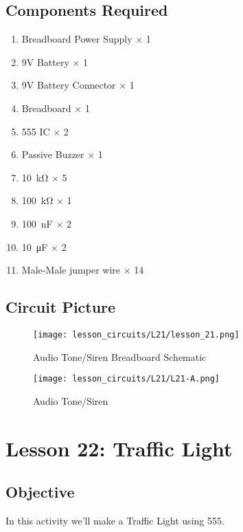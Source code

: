 \subsection{Components Required}
\begin{enumerate}
    \item Breadboard Power Supply $\times$ 1
    \item 9V Battery $\times$ 1
    \item 9V Battery Connector $\times$ 1
    \item Breadboard $\times$ 1
    \item 555 IC $\times$ 2
    \item Passive Buzzer $\times$ 1
    \item \SI{10}{\kilo\ohm} $\times$ 5
    \item \SI{100}{\kilo\ohm} $\times$ 1
    \item \SI{100}{\nano\farad} $\times$ 2
    \item \SI{10}{\micro\farad} $\times$ 2
    \item Male-Male jumper wire $\times$ 14
\end{enumerate}
\subsection{Circuit Picture}
\begin{figure}[!hp]
    \centering
    \texttt{[image: lesson\_circuits/L21/lesson\_21.png]}
    \caption{Audio Tone/Siren Breadboard Schematic}
    \label{fig:555_audsi_sch}
\end{figure}
\begin{figure}[!hp]
    \centering
    \texttt{[image: lesson\_circuits/L21/L21-A.png]}
    \caption{Audio Tone/Siren}
    \label{fig:555_audsi_obb}
\end{figure}
\section{Lesson 22: Traffic Light}
\subsection{Objective}
In this activity we'll make a Traffic Light using 555.
